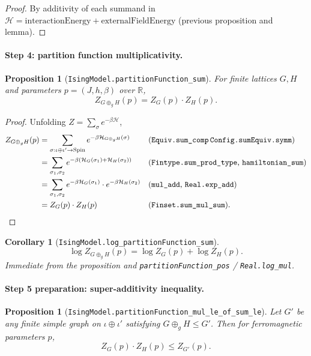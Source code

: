 \documentclass[a4paper,11pt]{article}
\newtheorem{proposition}[theorem]{Proposition}
\newtheorem{corollary}[theorem]{Corollary}
\begin{document}
\begin{proof}
By additivity of each summand in
$\mathcal{H} = \mathrm{interactionEnergy} + \mathrm{externalFieldEnergy}$
(previous proposition and lemma).
\end{proof}

\paragraph{Step 4: partition function multiplicativity.}

\begin{proposition}[\texttt{IsingModel.partitionFunction\_sum}]
For finite lattices $G, H$ and parameters $p = (J, h, \beta)$ over $\mathbb{R}$,
\[
  Z_{G \oplus_g H}(p) = Z_G(p) \cdot Z_H(p).
\]
\end{proposition}

\begin{proof}
Unfolding $Z = \sum_\sigma e^{-\beta \mathcal{H}}$,
\begin{align*}
  Z_{G \oplus_g H}(p)
  &= \sum_{\sigma : \iota \oplus \iota' \to \mathrm{Spin}}
       e^{-\beta \mathcal{H}_{G \oplus_g H}(\sigma)}
     && \text{(\texttt{Equiv.sum\_comp}\,\texttt{Config.sumEquiv.symm})} \\
  &= \sum_{\sigma_1, \sigma_2}
       e^{-\beta (\mathcal{H}_G(\sigma_1) + \mathcal{H}_H(\sigma_2))}
     && \text{(\texttt{Fintype.sum\_prod\_type}, \texttt{hamiltonian\_sum})} \\
  &= \sum_{\sigma_1, \sigma_2}
       e^{-\beta \mathcal{H}_G(\sigma_1)}
       \cdot e^{-\beta \mathcal{H}_H(\sigma_2)}
     && \text{(\texttt{mul\_add}, \texttt{Real.exp\_add})} \\
  &= Z_G(p) \cdot Z_H(p)
     && \text{(\texttt{Finset.sum\_mul\_sum}).}
\end{align*}
\end{proof}

\begin{corollary}[\texttt{IsingModel.log\_partitionFunction\_sum}]
\[
  \log Z_{G \oplus_g H}(p) = \log Z_G(p) + \log Z_H(p).
\]
Immediate from the proposition and
\texttt{partitionFunction\_pos} / \texttt{Real.log\_mul}.
\end{corollary}

\paragraph{Step 5 preparation: super-additivity inequality.}

\begin{proposition}[\texttt{IsingModel.partitionFunction\_mul\_le\_of\_sum\_le}]
Let $G'$ be any finite simple graph on $\iota \oplus \iota'$
satisfying $G \oplus_g H \le G'$. Then for ferromagnetic parameters
$p$,
\[
  Z_G(p) \cdot Z_H(p) \le Z_{G'}(p).
\]
\end{proposition}
\end{document}
